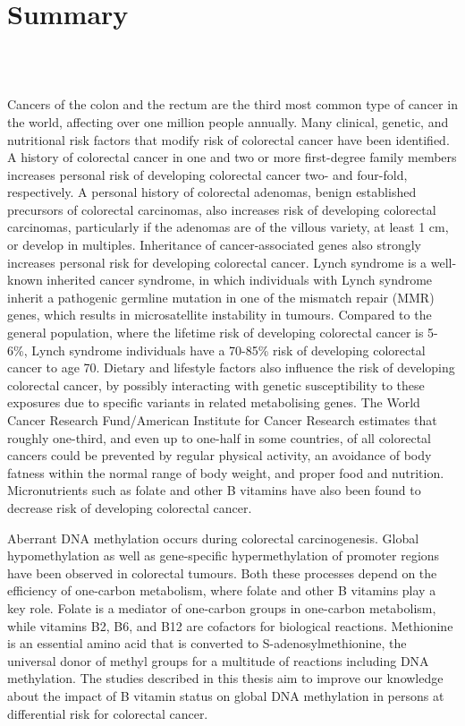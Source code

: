 \chapter*[Summary]{Summary}
\label{summary}

\quad\\

\quad\\

\newpage

\noindent Cancers of the colon and the rectum are the third most common type of cancer in the world, affecting over one million people annually. Many clinical, genetic, and nutritional risk factors that modify risk of colorectal cancer have been identified. A history of colorectal cancer in one and two or more first-degree family members increases personal risk of developing colorectal cancer two- and four-fold, respectively. A personal history of colorectal adenomas, benign established precursors of colorectal carcinomas, also increases risk of developing colorectal carcinomas, particularly if the adenomas are of the villous variety, at least 1 cm, or develop in multiples. Inheritance of cancer-associated genes also strongly increases personal risk for developing colorectal cancer. Lynch syndrome is a well-known inherited cancer syndrome, in which individuals with Lynch syndrome inherit a pathogenic germline mutation in one of the mismatch repair (MMR) genes, which results in microsatellite instability in tumours. Compared to the general population, where the lifetime risk of developing colorectal cancer is 5-6\%, Lynch syndrome individuals have a 70-85\% risk of developing colorectal cancer to age 70. Dietary and lifestyle factors also influence the risk of developing colorectal cancer, by possibly interacting with genetic susceptibility to these exposures due to specific variants in related metabolising genes. The World Cancer Research Fund/American Institute for Cancer Research estimates that roughly one-third, and even up to one-half in some countries, of all colorectal cancers could be prevented by regular physical activity, an avoidance of body fatness within the normal range of body weight, and proper food and nutrition. Micronutrients such as folate and other B vitamins have also been found to decrease risk of developing colorectal cancer.

\noindent Aberrant DNA methylation occurs during colorectal carcinogenesis. Global hypomethylation as well as gene-specific hypermethylation of promoter regions have been observed in colorectal tumours. Both these processes depend on the efficiency of one-carbon metabolism, where folate and other B vitamins play a key role. Folate is a mediator of one-carbon groups in one-carbon metabolism, while vitamins B2, B6, and B12 are cofactors for biological reactions. Methionine is an essential amino acid that is converted to S-adenosylmethionine, the universal donor of methyl groups for a multitude of reactions including DNA methylation. The studies described in this thesis aim to improve our knowledge about the impact of B vitamin status on global DNA methylation in persons at differential risk for colorectal cancer.


